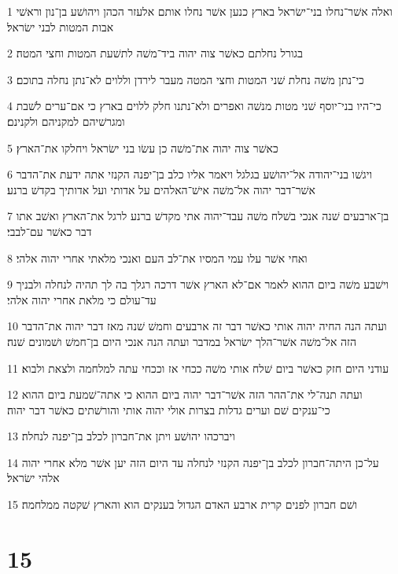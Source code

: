 \par 1 ואלה אשׁר־נחלו בני־ישׂראל בארץ כנען אשׁר נחלו אותם אלעזר הכהן ויהושׁע בן־נון וראשׁי אבות המטות לבני ישׂראל׃
\par 2 בגורל נחלתם כאשׁר צוה יהוה ביד־משׁה לתשׁעת המטות וחצי המטה׃
\par 3 כי־נתן משׁה נחלת שׁני המטות וחצי המטה מעבר לירדן וללוים לא־נתן נחלה בתוכם׃
\par 4 כי־היו בני־יוסף שׁני מטות מנשׁה ואפרים ולא־נתנו חלק ללוים בארץ כי אם־ערים לשׁבת ומגרשׁיהם למקניהם ולקנינם׃
\par 5 כאשׁר צוה יהוה את־משׁה כן עשׂו בני ישׂראל ויחלקו את־הארץ׃
\par 6 ויגשׁו בני־יהודה אל־יהושׁע בגלגל ויאמר אליו כלב בן־יפנה הקנזי אתה ידעת את־הדבר אשׁר־דבר יהוה אל־משׁה אישׁ־האלהים על אדותי ועל אדותיך בקדשׁ ברנע׃
\par 7 בן־ארבעים שׁנה אנכי בשׁלח משׁה עבד־יהוה אתי מקדשׁ ברנע לרגל את־הארץ ואשׁב אתו דבר כאשׁר עם־לבבי׃
\par 8 ואחי אשׁר עלו עמי המסיו את־לב העם ואנכי מלאתי אחרי יהוה אלהי׃
\par 9 וישׁבע משׁה ביום ההוא לאמר אם־לא הארץ אשׁר דרכה רגלך בה לך תהיה לנחלה ולבניך עד־עולם כי מלאת אחרי יהוה אלהי׃
\par 10 ועתה הנה החיה יהוה אותי כאשׁר דבר זה ארבעים וחמשׁ שׁנה מאז דבר יהוה את־הדבר הזה אל־משׁה אשׁר־הלך ישׂראל במדבר ועתה הנה אנכי היום בן־חמשׁ ושׁמונים שׁנה׃
\par 11 עודני היום חזק כאשׁר ביום שׁלח אותי משׁה ככחי אז וככחי עתה למלחמה ולצאת ולבוא׃
\par 12 ועתה תנה־לי את־ההר הזה אשׁר־דבר יהוה ביום ההוא כי אתה־שׁמעת ביום ההוא כי־ענקים שׁם וערים גדלות בצרות אולי יהוה אותי והורשׁתים כאשׁר דבר יהוה׃
\par 13 ויברכהו יהושׁע ויתן את־חברון לכלב בן־יפנה לנחלה׃
\par 14 על־כן היתה־חברון לכלב בן־יפנה הקנזי לנחלה עד היום הזה יען אשׁר מלא אחרי יהוה אלהי ישׂראל׃
\par 15 ושׁם חברון לפנים קרית ארבע האדם הגדול בענקים הוא והארץ שׁקטה ממלחמה׃

\chapter{15}

